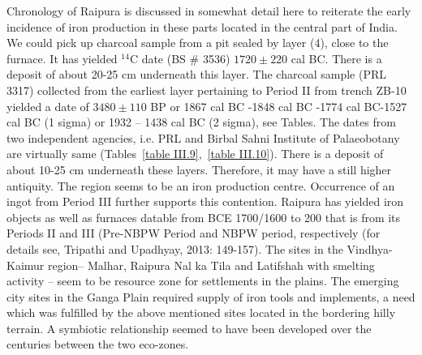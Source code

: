 Chronology of Raipura is discussed in somewhat detail here to reiterate the early incidence of iron production in these parts located in the central part of India. We could pick up charcoal sample from a pit sealed by layer (4), close to the furnace. It has yielded ${}^{14}$C date (BS \# 3536) $1720 \pm 220$ cal BC. There is a deposit of about 20-25 cm underneath this layer. The charcoal sample (PRL 3317) collected from the earliest layer pertaining to Period II from trench ZB-10 yielded a date of $3480\pm110$ BP or 1867 cal BC -1848 cal BC -1774 cal BC-1527 cal BC (1 sigma) or 1932 – 1438 cal BC (2 sigma), see Tables. The dates from two independent agencies, i.e. PRL and Birbal Sahni Institute of Palaeobotany are virtually same (Tables~\ref{table III.9},~\ref{table III.10}). There is a deposit of about 10-25 cm underneath these layers. Therefore, it may have a still higher antiquity. The region seems to be an iron production centre. Occurrence of an ingot from Period III further supports this contention. Raipura has yielded iron objects as well as furnaces datable from BCE 1700/1600 to 200 that is from its Periods II and III (Pre-NBPW Period and NBPW period, respectively (for details see, Tripathi and Upadhyay, 2013: 149-157). The sites in the Vindhya-Kaimur region– Malhar, Raipura Nal ka Tila and Latifshah with smelting activity – seem to be resource zone for settlements in the plains. The emerging city sites in the Ganga Plain required supply of iron tools and implements, a need which was fulfilled by the above mentioned sites located in the bordering hilly terrain. A symbiotic relationship seemed to have been developed over the centuries between the two eco-zones. 

